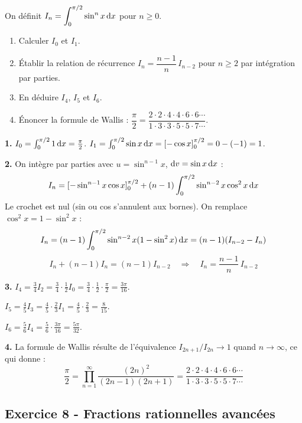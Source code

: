 \documentclass[12pt,a4paper]{article}
\begin{document}
\begin{boiteexercice}
On définit $I_n = \displaystyle\int_0^{\pi/2}\sin^n x\,\mathrm{d} x$ pour $n\geq0$.
\begin{enumerate}
  \item Calculer $I_0$ et $I_1$.
  \item Établir la relation de récurrence $I_n = \dfrac{n-1}{n}\,I_{n-2}$ pour $n\geq2$ par intégration par parties.
  \item En déduire $I_4$, $I_5$ et $I_6$.
  \item Énoncer la formule de Wallis : $\dfrac{\pi}{2} = \dfrac{2\cdot2\cdot4\cdot4\cdot6\cdot6\cdots}{1\cdot3\cdot3\cdot5\cdot5\cdot7\cdots}$.
\end{enumerate}
\end{boiteexercice}

\begin{boitecorrige}
\textbf{1.} $I_0 = \int_0^{\pi/2}1\,\mathrm{d} x = \frac{\pi}{2}$. $I_1 = \int_0^{\pi/2}\sin x\,\mathrm{d} x = [-\cos x]_0^{\pi/2} = 0-(-1) = 1$.

\textbf{2.} On intègre par parties avec $u=\sin^{n-1}x$, $\mathrm{d} v=\sin x\,\mathrm{d} x$ :
\[
I_n = [-\sin^{n-1}x\cos x]_0^{\pi/2} + (n-1)\int_0^{\pi/2}\sin^{n-2}x\cos^2 x\,\mathrm{d} x
\]
Le crochet est nul (sin ou cos s'annulent aux bornes). On remplace $\cos^2 x = 1-\sin^2 x$ :
\[
I_n = (n-1)\int_0^{\pi/2}\sin^{n-2}x(1-\sin^2 x)\,\mathrm{d} x = (n-1)(I_{n-2}-I_n)
\]
\[
I_n + (n-1)I_n = (n-1)I_{n-2} \quad \Rightarrow \quad \boxed{I_n = \frac{n-1}{n}\,I_{n-2}}
\]

\textbf{3.}
$I_4 = \frac{3}{4}I_2 = \frac{3}{4}\cdot\frac{1}{2}I_0 = \frac{3}{4}\cdot\frac{1}{2}\cdot\frac{\pi}{2} = \frac{3\pi}{16}$.

$I_5 = \frac{4}{5}I_3 = \frac{4}{5}\cdot\frac{2}{3}I_1 = \frac{4}{5}\cdot\frac{2}{3} = \frac{8}{15}$.

$I_6 = \frac{5}{6}I_4 = \frac{5}{6}\cdot\frac{3\pi}{16} = \frac{5\pi}{32}$.

\textbf{4.} La formule de Wallis résulte de l'équivalence $I_{2n+1}/I_{2n}\to1$ quand $n\to\infty$, ce qui donne :
\[
\frac{\pi}{2} = \prod_{n=1}^{\infty}\frac{(2n)^2}{(2n-1)(2n+1)} = \frac{2\cdot2\cdot4\cdot4\cdot6\cdot6\cdots}{1\cdot3\cdot3\cdot5\cdot5\cdot7\cdots}
\]
\end{boitecorrige}

\subsection*{Exercice 8 - Fractions rationnelles avancées \niveau{\moyen}}
\end{document}
